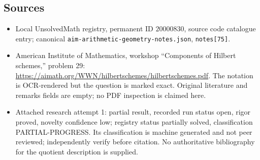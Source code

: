 \documentclass[11pt]{article}
\begin{document}
\subsection{Sources}
\begin{itemize}
\item Local UnsolvedMath registry, permanent ID $20000830$, source code catalogue entry; canonical \texttt{aim-arithmetic-geometry-notes.json}, \texttt{notes[75]}.
\item American Institute of Mathematics, workshop ``Components of Hilbert schemes,'' problem 29: \url{https://aimath.org/WWN/hilbertschemes/hilbertschemes.pdf}. The notation is OCR-rendered but the question is marked exact. Original literature and remarks fields are empty; no PDF inspection is claimed here.
\item Attached research attempt 1: partial result, recorded run status open, rigor proved, novelty confidence low; registry status partially solved, classification PARTIAL-PROGRESS. Its classification is machine generated and not peer reviewed; independently verify before citation. No authoritative bibliography for the quotient description is supplied.
\end{itemize}
\end{document}
